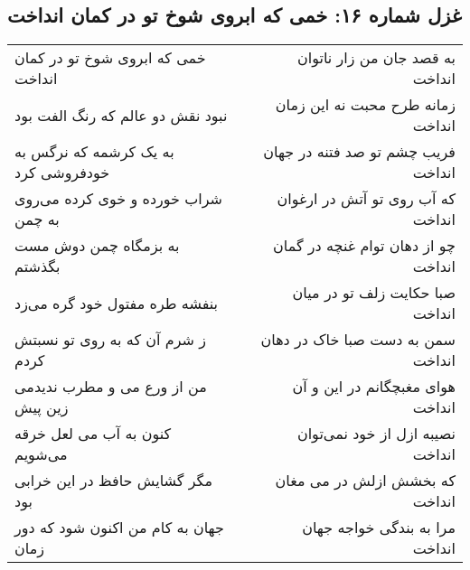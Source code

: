 \begin{center}
\section*{غزل شماره ۱۶: خمی که ابروی شوخ تو در کمان انداخت}
\label{sec:sh016}
\begin{longtable}{l p{0.5cm} r}
خمی که ابروی شوخ تو در کمان انداخت
&&
به قصد جان من زار ناتوان انداخت
\\
نبود نقش دو عالم که رنگ الفت بود
&&
زمانه طرح محبت نه این زمان انداخت
\\
به یک کرشمه که نرگس به خودفروشی کرد
&&
فریب چشم تو صد فتنه در جهان انداخت
\\
شراب خورده و خوی کرده می‌روی به چمن
&&
که آب روی تو آتش در ارغوان انداخت
\\
به بزمگاه چمن دوش مست بگذشتم
&&
چو از دهان توام غنچه در گمان انداخت
\\
بنفشه طره مفتول خود گره می‌زد
&&
صبا حکایت زلف تو در میان انداخت
\\
ز شرم آن که به روی تو نسبتش کردم
&&
سمن به دست صبا خاک در دهان انداخت
\\
من از ورع می و مطرب ندیدمی زین پیش
&&
هوای مغبچگانم در این و آن انداخت
\\
کنون به آب می لعل خرقه می‌شویم
&&
نصیبه ازل از خود نمی‌توان انداخت
\\
مگر گشایش حافظ در این خرابی بود
&&
که بخشش ازلش در می مغان انداخت
\\
جهان به کام من اکنون شود که دور زمان
&&
مرا به بندگی خواجه جهان انداخت
\\
\end{longtable}
\end{center}
